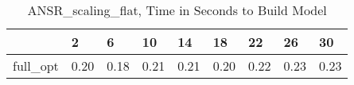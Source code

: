 \begin{table}
\caption{ANSR\_scaling\_flat, Time in Seconds to Build Model}
\label{ANSR_scaling_flat_model_time}
\begin{tabular}{lllllllll}
\toprule
 & 2 & 6 & 10 & 14 & 18 & 22 & 26 & 30 \\
\midrule
full\_opt & 0.20 & 0.18 & 0.21 & 0.21 & 0.20 & 0.22 & 0.23 & 0.23 \\
\bottomrule
\end{tabular}
\end{table}
